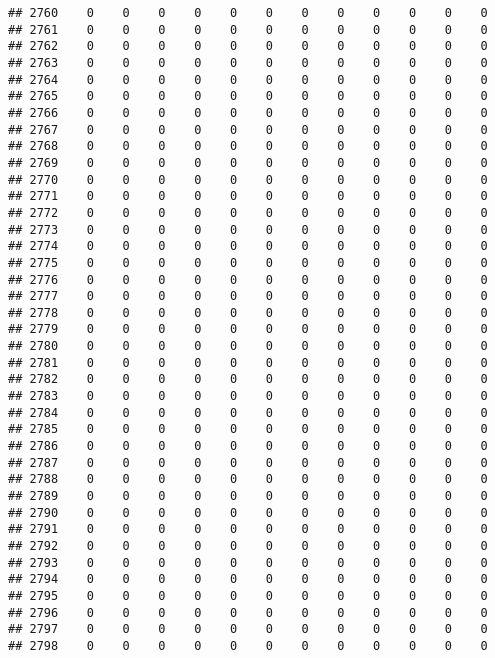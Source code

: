 \documentclass[]{article}
\begin{document}
\begin{verbatim}
## 2760    0    0    0    0    0    0    0    0    0    0    0    0
## 2761    0    0    0    0    0    0    0    0    0    0    0    0
## 2762    0    0    0    0    0    0    0    0    0    0    0    0
## 2763    0    0    0    0    0    0    0    0    0    0    0    0
## 2764    0    0    0    0    0    0    0    0    0    0    0    0
## 2765    0    0    0    0    0    0    0    0    0    0    0    0
## 2766    0    0    0    0    0    0    0    0    0    0    0    0
## 2767    0    0    0    0    0    0    0    0    0    0    0    0
## 2768    0    0    0    0    0    0    0    0    0    0    0    0
## 2769    0    0    0    0    0    0    0    0    0    0    0    0
## 2770    0    0    0    0    0    0    0    0    0    0    0    0
## 2771    0    0    0    0    0    0    0    0    0    0    0    0
## 2772    0    0    0    0    0    0    0    0    0    0    0    0
## 2773    0    0    0    0    0    0    0    0    0    0    0    0
## 2774    0    0    0    0    0    0    0    0    0    0    0    0
## 2775    0    0    0    0    0    0    0    0    0    0    0    0
## 2776    0    0    0    0    0    0    0    0    0    0    0    0
## 2777    0    0    0    0    0    0    0    0    0    0    0    0
## 2778    0    0    0    0    0    0    0    0    0    0    0    0
## 2779    0    0    0    0    0    0    0    0    0    0    0    0
## 2780    0    0    0    0    0    0    0    0    0    0    0    0
## 2781    0    0    0    0    0    0    0    0    0    0    0    0
## 2782    0    0    0    0    0    0    0    0    0    0    0    0
## 2783    0    0    0    0    0    0    0    0    0    0    0    0
## 2784    0    0    0    0    0    0    0    0    0    0    0    0
## 2785    0    0    0    0    0    0    0    0    0    0    0    0
## 2786    0    0    0    0    0    0    0    0    0    0    0    0
## 2787    0    0    0    0    0    0    0    0    0    0    0    0
## 2788    0    0    0    0    0    0    0    0    0    0    0    0
## 2789    0    0    0    0    0    0    0    0    0    0    0    0
## 2790    0    0    0    0    0    0    0    0    0    0    0    0
## 2791    0    0    0    0    0    0    0    0    0    0    0    0
## 2792    0    0    0    0    0    0    0    0    0    0    0    0
## 2793    0    0    0    0    0    0    0    0    0    0    0    0
## 2794    0    0    0    0    0    0    0    0    0    0    0    0
## 2795    0    0    0    0    0    0    0    0    0    0    0    0
## 2796    0    0    0    0    0    0    0    0    0    0    0    0
## 2797    0    0    0    0    0    0    0    0    0    0    0    0
## 2798    0    0    0    0    0    0    0    0    0    0    0    0

\end{verbatim}
\end{document}
